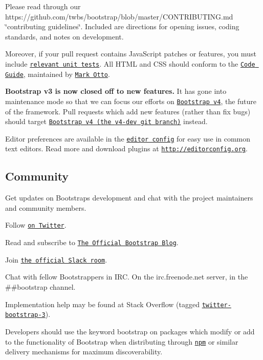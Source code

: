 Please read through our https\+://github.com/twbs/bootstrap/blob/master/\+C\+O\+N\+T\+R\+I\+B\+U\+T\+I\+N\+G.\+md \char`\"{}contributing guidelines\char`\"{}. Included are directions for opening issues, coding standards, and notes on development.

Moreover, if your pull request contains Java\+Script patches or features, you must include \href{https://github.com/twbs/bootstrap/tree/master/js/tests}{\tt relevant unit tests}. All H\+T\+ML and C\+SS should conform to the \href{https://github.com/mdo/code-guide}{\tt Code Guide}, maintained by \href{https://github.com/mdo}{\tt Mark Otto}.

{\bfseries Bootstrap v3 is now closed off to new features.} It has gone into maintenance mode so that we can focus our efforts on \href{https://github.com/twbs/bootstrap/tree/v4-dev}{\tt Bootstrap v4}, the future of the framework. Pull requests which add new features (rather than fix bugs) should target \href{https://github.com/twbs/bootstrap/tree/v4-dev}{\tt Bootstrap v4 (the {\ttfamily v4-\/dev} git branch)} instead.

Editor preferences are available in the \href{https://github.com/twbs/bootstrap/blob/master/.editorconfig}{\tt editor config} for easy use in common text editors. Read more and download plugins at \href{http://editorconfig.org}{\tt http\+://editorconfig.\+org}.

\subsection*{Community}

Get updates on Bootstrap\textquotesingle{}s development and chat with the project maintainers and community members.


\begin{DoxyItemize}
\item Follow \href{https://twitter.com/getbootstrap}{\tt on Twitter}.
\item Read and subscribe to \href{http://blog.getbootstrap.com}{\tt The Official Bootstrap Blog}.
\item Join \href{https://bootstrap-slack.herokuapp.com}{\tt the official Slack room}.
\item Chat with fellow Bootstrappers in I\+RC. On the {\ttfamily irc.\+freenode.\+net} server, in the {\ttfamily \#\#bootstrap} channel.
\item Implementation help may be found at Stack Overflow (tagged \href{https://stackoverflow.com/questions/tagged/twitter-bootstrap-3}{\tt {\ttfamily twitter-\/bootstrap-\/3}}).
\item Developers should use the keyword {\ttfamily bootstrap} on packages which modify or add to the functionality of Bootstrap when distributing through \href{https://www.npmjs.com/browse/keyword/bootstrap}{\tt npm} or similar delivery mechanisms for maximum discoverability.
\end{DoxyItemize}

